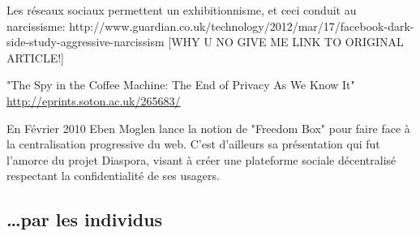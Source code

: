 Les réseaux sociaux permettent un exhibitionnisme, et ceci conduit au 
narcissisme:
http://www.guardian.co.uk/technology/2012/mar/17/facebook-dark-side-study-aggressive-narcissism 
[WHY U NO GIVE ME LINK TO ORIGINAL ARTICLE!]

"The Spy in the Coffee Machine: The End of Privacy As We Know It"
 \url{http://eprints.soton.ac.uk/265683/}

En Février 2010 Eben Moglen lance la notion de "Freedom Box" pour faire face à
la centralisation progressive du web. C'est d'ailleurs sa présentation qui fut
l'amorce du projet Diaspora, visant à créer une plateforme sociale décentralisé 
respectant la confidentialité de ses usagers. 

\subsection{\ldots par les individus}



